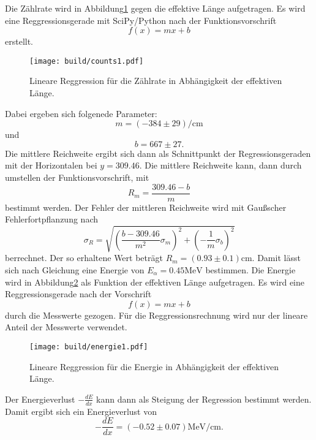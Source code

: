 \noindent Die Zählrate wird in Abbildung\ref{fig:c1} gegen die effektive Länge aufgetragen.
Es wird eine Reggressionsgerade mit SciPy/Python nach der Funktionsvorschrift
\begin{equation*}
  f(x) = mx +b
\end{equation*}
erstellt.
\begin{figure}[H]
  \centering
  \texttt{[image: build/counts1.pdf]}
  \caption{Lineare Reggression für die Zählrate in Abhängigkeit der effektiven Länge.}
  \label{fig:c1}
\end{figure}
\noindent Dabei ergeben sich folgenede Parameter:
\begin{equation*}
  m =(-384\pm29)\si{\per\centi\meter}
\end{equation*}
und
\begin{equation*}
  b =667\pm27  .
\end{equation*}
Die mittlere Reichweite ergibt sich dann als Schnittpunkt der Regressionsgeraden mit der Horizontalen bei $y=309.46$.
Die mittlere Reichweite kann, dann durch umstellen der Funktionsvorschrift, mit
\begin{equation*}
  R_m=\frac{309.46-b}{m}
\end{equation*}
bestimmt werden.
Der Fehler der mittleren Reichweite wird mit Gaußscher Fehlerfortpflanzung nach
\begin{equation*}
  \sigma_R = \sqrt{(\frac{b-309.46}{m^2}\sigma_m)^2 +(-\frac{1}{m}\sigma_b)^2}
\end{equation*}
berrechnet.
Der so erhaltene Wert beträgt $R_m= (0.93\pm0.1)\si{\centi\meter}$.
Damit lässt sich nach Gleichung eine Energie von $E_{\alpha} = 0.45\si{\mega\electronvolt}$ bestimmen.
Die Energie wird in Abbildung\ref{fig:e1} als Funktion der effektiven Länge aufgetragen.
Es wird eine Reggressionsgerade nach der Vorschrift
\begin{equation*}
  f(x) = mx + b
\end{equation*}
durch die Messwerte gezogen.
Für die Reggressionsrechnung wird nur der lineare Anteil der Messwerte verwendet.
\begin{figure}[H]
  \centering
  \texttt{[image: build/energie1.pdf]}
  \caption{Lineare Reggression für die Energie in Abhängigkeit der effektiven Länge.}
  \label{fig:e1}
\end{figure}
\noindent Der Energieverlust $-\frac{dE}{dx}$ kann dann als Steigung der Regression bestimmt werden.
Damit ergibt sich ein Energieverlust von
\begin{equation*}
  -\frac{dE}{dx} =(-0.52\pm0.07)\si{\mega\electronvolt\per\centi\meter} .
\end{equation*}
